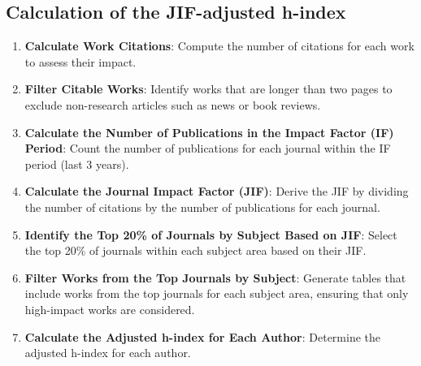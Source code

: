 \subsection{Calculation of the JIF-adjusted h-index}
\begin{enumerate}
      \item \textbf{Calculate Work Citations}: Compute the number of citations for each work to assess their impact.

      \item \textbf{Filter Citable Works}: Identify works that are longer than two pages to exclude non-research articles such as news or book reviews.

      \item \textbf{Calculate the Number of Publications in the Impact Factor (IF) Period}: Count the number of publications
            for each journal within the IF period (last 3 years).

      \item \textbf{Calculate the Journal Impact Factor (JIF)}: Derive the JIF by dividing the number of citations by
            the number of publications for each journal.

      \item \textbf{Identify the Top 20\% of Journals by Subject Based on JIF}: Select the top 20\% of journals within
            each subject area based on their JIF\@.

      \item \textbf{Filter Works from the Top Journals by Subject}: Generate tables that include works from
            the top journals for each subject area, ensuring that only high-impact works are considered.

      \item \textbf{Calculate the Adjusted h-index for Each Author}: Determine the adjusted h-index for each author.
\end{enumerate}

